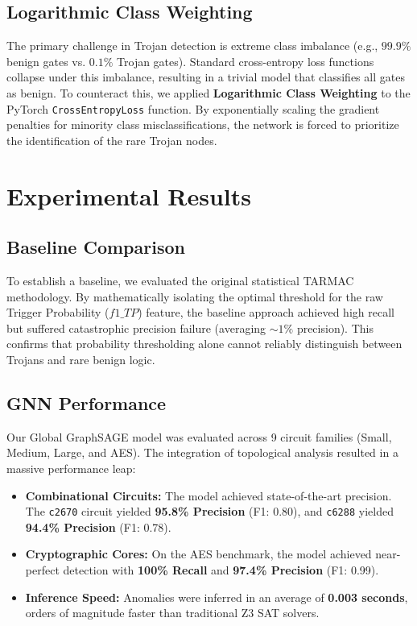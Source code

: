 \documentclass[conference]{IEEEtran}
\begin{document}
\subsection{Logarithmic Class Weighting}
The primary challenge in Trojan detection is extreme class imbalance (e.g., $99.9\%$ benign gates vs. $0.1\%$ Trojan gates). Standard cross-entropy loss functions collapse under this imbalance, resulting in a trivial model that classifies all gates as benign. 
To counteract this, we applied \textbf{Logarithmic Class Weighting} to the PyTorch \texttt{CrossEntropyLoss} function. By exponentially scaling the gradient penalties for minority class misclassifications, the network is forced to prioritize the identification of the rare Trojan nodes.

\section{Experimental Results}

\subsection{Baseline Comparison}
To establish a baseline, we evaluated the original statistical TARMAC methodology. By mathematically isolating the optimal threshold for the raw Trigger Probability ($f1\_TP$) feature, the baseline approach achieved high recall but suffered catastrophic precision failure (averaging $\sim1\%$ precision). This confirms that probability thresholding alone cannot reliably distinguish between Trojans and rare benign logic.

\subsection{GNN Performance}
Our Global GraphSAGE model was evaluated across 9 circuit families (Small, Medium, Large, and AES). 
The integration of topological analysis resulted in a massive performance leap:
\begin{itemize}
    \item \textbf{Combinational Circuits:} The model achieved state-of-the-art precision. The \texttt{c2670} circuit yielded \textbf{95.8\% Precision} (F1: 0.80), and \texttt{c6288} yielded \textbf{94.4\% Precision} (F1: 0.78).
    \item \textbf{Cryptographic Cores:} On the AES benchmark, the model achieved near-perfect detection with \textbf{100\% Recall} and \textbf{97.4\% Precision} (F1: 0.99).
    \item \textbf{Inference Speed:} Anomalies were inferred in an average of \textbf{0.003 seconds}, orders of magnitude faster than traditional Z3 SAT solvers.
\end{itemize}
\end{document}
